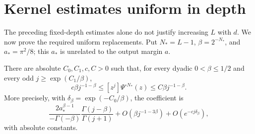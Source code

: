 \section{Kernel estimates uniform in depth}\label{sec:uniform-kernel}
The preceding fixed-depth estimates alone do not justify increasing
$L$ with $d$. We now prove the required uniform replacements. Put
$N_*=L-1$, $\beta=2^{-N_*}$, and $a_*=\pi^2/8$; this $a_*$ is unrelated
to the output margin $a$.

\begin{lemma}\label{lem:uniform-coeff}
There are absolute $C_0,C_1,c,C>0$ such that, for every dyadic
$0<\beta\le1/2$ and every odd $j\ge\exp(C_1/\beta)$,
\[
 c\beta j^{-1-\beta}\le [z^j]\Psi^{\circ N_*}(z)
       \le C\beta j^{-1-\beta}.
\]
More precisely, with $\delta_\beta=\exp(-C_0/\beta)$, the coefficient is
\[
 \frac{2a_*^{\beta-1}}{-\Gamma(-\beta)}
 \frac{\Gamma(j-\beta)}{\Gamma(j+1)}
 +O(\beta j^{-1-3\beta})+O(e^{-cj\delta_\beta}),
\]
with absolute constants.
\end{lemma}
